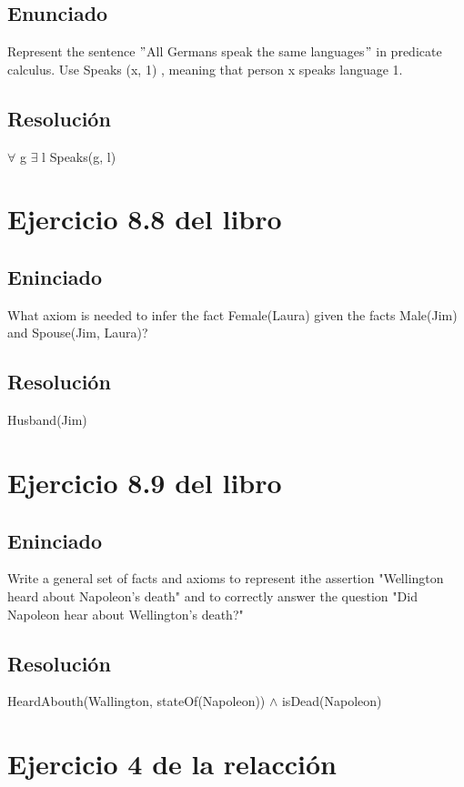 \documentclass[a4paper,10pt]{article}
\begin{document}
\subsection{Enunciado}
Represent the sentence $"$All Germans speak the same languages$"$ in predicate calculus.
Use Speaks (x, 1) , meaning that person x speaks language 1.
\subsection{Resolución}
$\forall$ g $\exists$ l Speaks(g, l)

\section{Ejercicio 8.8 del libro}
\subsection{Eninciado}
What axiom is needed to infer the fact Female(Laura) given the facts Male(Jim) and
Spouse(Jim, Laura)?
\subsection{Resolución}
Husband(Jim)

\section{Ejercicio 8.9 del libro}
\subsection{Eninciado}
Write a general set of facts and axioms to represent ithe assertion "Wellington heard
about Napoleon's death" and to correctly answer the question "Did Napoleon hear about
Wellington's death?"
\subsection{Resolución}
HeardAbouth(Wallington, stateOf(Napoleon)) $\land$ isDead(Napoleon)

\section{Ejercicio 4 de la relacción}
\end{document}
